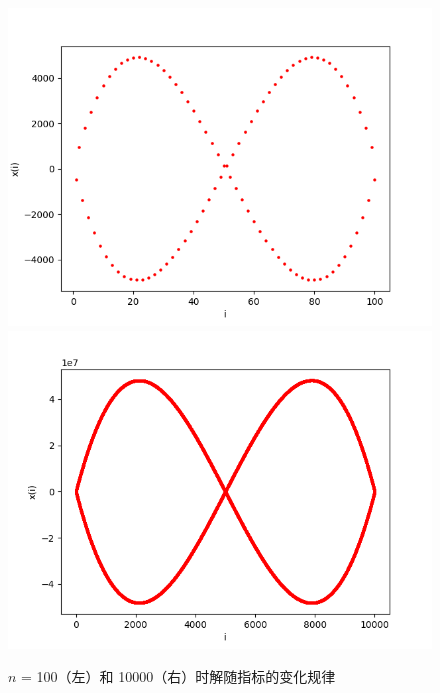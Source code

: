 \documentclass{ctexart}
\begin{document}
\begin{figure}[ht]
\centering
\includegraphics[scale = 0.5]{eqn100.png}
\includegraphics[scale = 0.5]{eqn10000.png}
\caption{$n$ = 100（左）和 10000（右）时解随指标的变化规律}
\end{figure}
\end{document}
